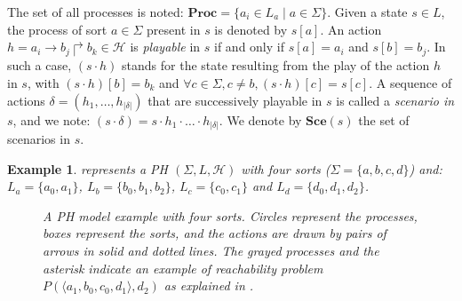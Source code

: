 \documentclass{movep}
\makeatletter
\def\pref{\prettyref}
\newtheorem*{example*}{Example}{\itshape}{}
\newcommand{\PHs}{\Sigma}
\newcommand{\PHl}{L}
\newcommand{\Proc}{\mathbf{Proc}}
\newcommand{\PHa}{\PHh}
\newcommand{\PHh}{\mathcal{H}}
\def\play{\cdot}
\newcommand{\card}[1]{{|#1|}}
\newcommand{\PHfrappeA}{\rightarrow}
\newcommand{\PHfrappeB}{\Rsh}
\newcommand{\PHfrappe}[3]{#1\PHfrappeA#2\PHfrappeB#3}
\def\Sce{\mathbf{Sce}}
\def\PHget#1#2{{#1[#2]}}
\newcommand{\PHetat}[1]{\mbox{$\langle #1 \rangle$}}
\newcommand{\currentScope}{}
\newcommand{\currentSort}{}
\newcommand{\currentSortLabel}{}
\newcommand{\currentAlign}{}
\newcommand{\currentSize}{}
\newcounter{la}
\newcommand{\TSort}[4]{
  \renewcommand{\currentScope}{#1}
  \renewcommand{\currentSort}{#2}
  \renewcommand{\currentSize}{#3}
  \renewcommand{\currentAlign}{#4}
  \ifcsname TUserSort@\currentSort\endcsname
    \renewcommand{\currentSortLabel}{\csname TUserSort@\currentSort\endcsname}
  \else
    \renewcommand{\currentSortLabel}{\currentSort}
  \fi
  \begin{scope}[shift={\currentScope}]
  \ifthenelse{\equal{\currentAlign}{l}}{
    \filldraw[process box] (-0.5,-0.5) rectangle (0.5,\currentSize-0.5);
    \node[sort] at (-0.2,\currentSize-0.4) {\currentSortLabel};
   }{\ifthenelse{\equal{\currentAlign}{r}}{
     \filldraw[process box] (-0.5,-0.5) rectangle (0.5,\currentSize-0.5);
     \node[sort] at (0.2,\currentSize-0.4) {\currentSortLabel};
   }{
    \filldraw[process box] (-0.5,-0.5) rectangle (\currentSize-0.5,0.5);
    \ifthenelse{\equal{\currentAlign}{t}}{
      \node[sort,anchor=east] at (-0.3,0.2) {\currentSortLabel};
    }{
      \node[sort] at (-0.6,-0.2) {\currentSortLabel};
    }
   }}
  \setcounter{la}{\currentSize}
  \addtocounter{la}{-1}
  \foreach \i in {0,...,\value{la}} {
    \TProc{\i}
  }
  \end{scope}
}
\newcommand{\TTickProc}[2]{ %
  \ifthenelse{\equal{\currentAlign}{l}}{
    \draw[tick] (-0.6,#1) -- (-0.4,#1);
    \node[tick label, anchor=east] at (-0.55,#1) {#2};
   }{\ifthenelse{\equal{\currentAlign}{r}}{
    \draw[tick] (0.6,#1) -- (0.4,#1);
    \node[tick label, anchor=west] at (0.55,#1) {#2};
   }{
    \ifthenelse{\equal{\currentAlign}{t}}{
      \draw[tick] (#1,0.6) -- (#1,0.4);
      \node[tick label, anchor=south] at (#1,0.55) {#2};
    }{
      \draw[tick] (#1,-0.6) -- (#1,-0.4);
      \node[tick label, anchor=north] at (#1,-0.55) {#2};
    }
   }}
}
\newcommand{\myProc}[3]{
  \ifcsname TUserTick@\currentSort_#1\endcsname
    \TTickProc{#1}{\csname TUserTick@\currentSort_#1\endcsname}
  \else
    \TTickProc{#1}{#1}
  \fi
  \ifthenelse{\equal{\currentAlign}{l}\or\equal{\currentAlign}{r}}{
    \node[#2] (\currentSort_#1) at (0,#1) {#3};
  }{
    \node[#2] (\currentSort_#1) at (#1,0) {#3};
  }
}
\newcommand{\TProc}[1]{
  \ifcsname TUserProcStyle@\currentSort_#1\endcsname
    \myProc{#1}{\csname TUserProcStyle@\currentSort_#1\endcsname}{}
  \else
    \myProc{#1}{process}{}
  \fi
}
\newcommand{\repcommand}[2]{
  \providecommand{#1}{#2}
  \renewcommand{#1}{#2}
}
\newcommand{\THit}[5]{
  \path[hit] (#1) edge[#2] (#3#4);
  \expandafter\repcommand\expandafter{\csname TBounce@#3@#5\endcsname}{#4}
}
\newcommand{\TBounce}[4]{
  (#1\csname TBounce@#1@#3\endcsname) edge[#2] (#3#4)
}
\newcommand{\TState}[1]{
  \foreach \proc in {#1} {
    \node[current process] (\proc) at (\proc.center) {};
  }
}
\makeatother
\begin{document}
\noindent
The set of all processes is noted: $\Proc = \{ a_i \in \PHl_a \mid a \in \PHs \}$.
Given a state $s\in \PHl$, the process of sort $a\in\PHs$ present in $s$ is denoted by $\PHget{s}{a}$.
An action $h=\PHfrappe{a_i}{b_j}{b_k} \in \PHa$ is \emph{playable} in $s$ if and only if
$\PHget{s}{a}=a_i$ and $\PHget{s}{b} = b_j$.
In such a case, $(s\play h)$ stands for the state resulting from the play of the action
$h$ in $s$, with $\PHget{(s\play h)}{b} = b_k$ and
$\forall c \in \PHs, c \neq b, \PHget{(s\play h)}{c} = \PHget{s}{c}$.
A sequence of actions $\delta = (h_1, \ldots, h_\card{\delta})$ that are successively playable in $s$
is called a \emph{scenario in $s$}, and we note:
$(s \play \delta) = s \play h_1 \play \ldots \play h_\card{\delta}$.
We denote by $\Sce(s)$ the set of scenarios in $s$.

\begin{example*}
\pref{fig:ph} represents a PH $(\PHs,\PHl,\PHa)$ with four sorts
($\PHs = \{a, b, c, d\}$) and:
$\PHl_a = \{a_0, a_1\}$,
$\PHl_b = \{b_0, b_1, b_2\}$,
$\PHl_c = \{c_0, c_1\}$ and
$\PHl_{d} = \{d_0, d_1, d_2\}$.

\begin{figure}[ht]
\centering
{}
\caption{\label{fig:ph}%
A PH model example with four sorts.
Circles represent the processes, boxes represent the sorts,
and the actions are drawn by pairs of arrows in solid and dotted lines.
The grayed processes and the asterisk indicate
an example of reachability problem $P(\PHetat{a_1,b_0,c_0,d_1}, d_2)$
as explained in \pref{sec:reachability}.
}
\end{figure}
\end{example*}
\end{document}
